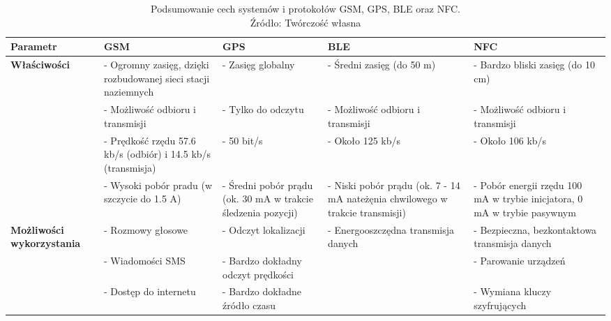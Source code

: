 \begin{table}[H]
\centering
\caption{Podsumowanie cech systemów i protokołów GSM, GPS, BLE oraz NFC.\\ Źródło: Twórczość własna}
\label{table:table_nmea_messages}
\begin{tabular}{| p{2.5cm} | p{3.5cm} | p{3cm} | p{3cm} | p{3.5cm} |}
\hline
\textbf{Parametr} &  \textbf{GSM} & \textbf{GPS}	& \textbf{BLE} & \textbf{NFC} \\ \hline	
\textbf{Właściwości} & - Ogromny zasięg, dzięki rozbudowanej sieci stacji naziemnych & - Zasięg globalny & - Średni zasięg (do 50 m) & - Bardzo bliski zasięg (do 10 cm) \\
			& - Możliwość odbioru i transmisji & - Tylko do odczytu & - Możliwość odbioru i transmisji & - Możliwość odbioru i transmisji \\
			& - Prędkość rzędu 57.6 kb/s (odbiór) i 14.5 kb/s (transmisja) & - 50 bit/s & - Około 125 kb/s & - Około 106 kb/s \\
			& - Wysoki pobór pradu (w szczycie do 1.5 A) & - Średni pobór prądu (ok. 30 mA w trakcie śledzenia pozycji) & - Niski pobór prądu (ok. 7 - 14 mA nateżęnia chwilowego w trakcie transmisji) & - Pobór energii rzędu 100 mA w trybie inicjatora, 0 mA w trybie pasywnym \\ \hline
\textbf{Możliwości wykorzystania} & - Rozmowy głosowe & - Odczyt lokalizacji & - Energooszczędna transmisja danych & - Bezpieczna, bezkontaktowa transmisja danych \\
						& - Wiadomości SMS & - Bardzo dokładny odczyt prędkości & & - Parowanie urządzeń \\
						& - Dostęp do internetu & - Bardzo dokładne źródło czasu & & - Wymiana kluczy szyfrujących \\ \hline
\end{tabular}
\end{table}


